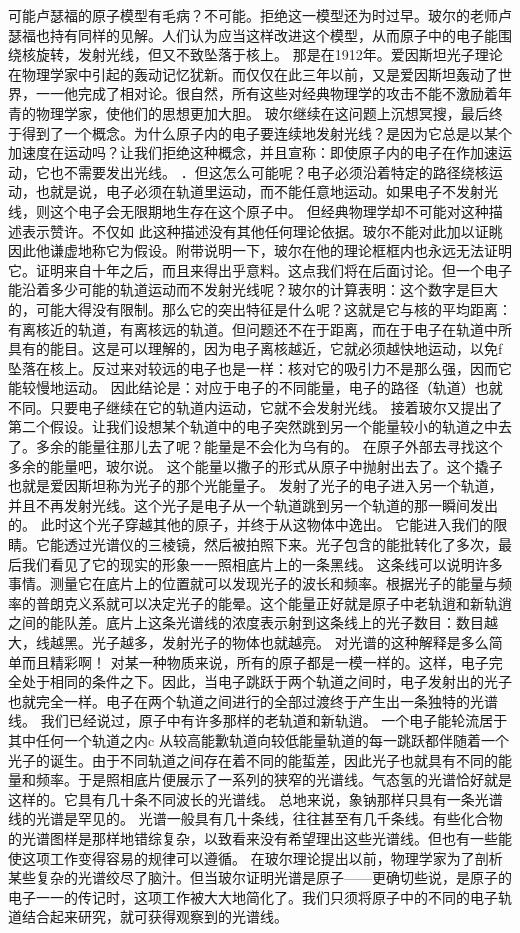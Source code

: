 可能卢瑟福的原子模型有毛病？不可能。拒绝这一模型还为时过早。玻尔的老师卢瑟福也持有同样的见解。人们认为应当这样改进这个模型，从而原子中的电子能围绕核旋转，发射光线，但又不致坠落于核上。
那是在1912年。爱因斯坦光子理论在物理学家中引起的轰动记忆犹新。而仅仅在此三年以前，又是爱因斯坦轰动了世界，一一他完成了相对论。很自然，所有这些对经典物理学的攻击不能不激励着年青的物理学家，使他们的思想更加大胆。
玻尔继续在这问题上沉想冥搜，最后终于得到了一个概念。为什么原子内的电子要连续地发射光线？是因为它总是以某个加速度在运动吗？让我们拒绝这种概念，并且宣称：即使原子内的电子在作加速运动，它也不需要发出光线。
．但这怎么可能呢？电子必须沿着特定的路径绕核运动，也就是说，电子必须在轨道里运动，而不能任意地运动。如果电子不发射光线，则这个电子会无限期地生存在这个原子中。
但经典物理学却不可能对这种描述表示赞许。不仅如
此这种描述没有其他任何理论依据。玻尔不能对此加以证眺因此他谦虚地称它为假设。附带说明一下，玻尔在他的理论框框内也永远无法证明它。证明来自十年之后，而且来得出乎意料。这点我们将在后面讨论。但一个电子能沿着多少可能的轨道运动而不发射光线呢？玻尔的计算表明：这个数字是巨大的，可能大得没有限制。那么它的突出特征是什么呢？这就是它与核的平均距离：有离核近的轨道，有离核远的轨道。但问题还不在于距离，而在于电子在轨道中所具有的能目。这是可以理解的，因为电子离核越近，它就必须越快地运动，以免f坠落在核上。反过来对较远的电子也是一样：核对它的吸引力不是那么强，因而它能较慢地运动。
因此结论是：对应于电子的不同能量，电子的路径（轨道）也就不同。只要电子继续在它的轨道内运动，它就不会发射光线。
接着玻尔又提出了第二个假设。让我们设想某个轨道中的电子突然跳到另一个能量较小的轨道之中去了。多余的能量往那儿去了呢？能量是不会化为乌有的。
在原子外部去寻找这个多余的能量吧，玻尔说。
这个能量以撒子的形式从原子中抛射出去了。这个撬子也就是爱因斯坦称为光子的那个光能量子。
发射了光子的电子进入另一个轨道，并且不再发射光线。这个光子是电子从一个轨道跳到另一个轨道的那一瞬间发出的。
此时这个光子穿越其他的原子，并终于从这物体中逸出。
它能进入我们的限睛。它能透过光谱仪的三棱镜，然后被拍照下来。光子包含的能批转化了多次，最后我们看见了它的现实的形象一一照相底片上的一条黑线。
这条线可以说明许多事情。测量它在底片上的位置就可以发现光子的波长和频率。根据光子的能量与频率的普朗克义系就可以决定光子的能晕。这个能量正好就是原子中老轨逍和新轨逍之间的能队差。底片上这条光谱线的浓度表示射到这条线上的光子数目：数目越大，线越黑。光子越多，发射光子的物体也就越亮。
对光谱的这种解释是多么简单而且精彩啊！
对某一种物质来说，所有的原子都是一模一样的。这样，电子完全处于相同的条件之下。因此，当电子跳跃于两个轨道之间时，电子发射出的光子也就完全一样。电子在两个轨道之间进行的全部过渡终于产生出一条独特的光谱线。
我们已经说过，原子中有许多那样的老轨道和新轨逍。
一个电子能轮流居于其中任何一个轨道之内c
从较高能歉轨道向较低能量轨道的每一跳跃都伴随着一个光子的诞生。由于不同轨道之间存在着不同的能蜇差，因此光子也就具有不同的能量和频率。于是照相底片便展示了一系列的狭窄的光谱线。气态氢的光谱恰好就是这样的。它具有几十条不同波长的光谱线。
总地来说，象钠那样只具有一条光谱线的光谱是罕见的。
光谱一般具有几十条线，往往甚至有几千条线。有些化合物的光谱图样是那样地错综复杂，以致看来没有希望理出这些光谱线。但也有一些能使这项工作变得容易的规律可以遵循。
在玻尔理论提出以前，物理学家为了剖析某些复杂的光谱绞尽了脑汁。但当玻尔证明光谱是原子——更确切些说，是原子的电子一一的传记时，这项工作被大大地简化了。我们只须将原子中的不同的电子轨道结合起来研究，就可获得观察到的光谱线。

